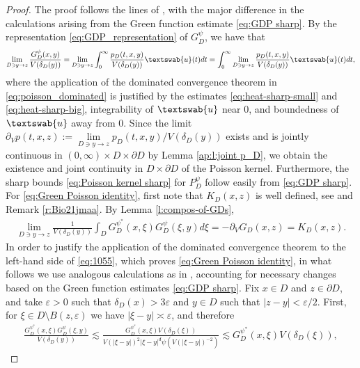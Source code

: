 \documentclass[12pt,a4paper,onecolumn]{article}
\theoremstyle{definition}
\newcommand{\1}{\mathbf 1}
\newcommand{\de}{\delta_D}
\newcommand{\GDP}{G_D^\psi}
\newcommand{\GDPs}{G_D^{\psi^*}}
\newcommand{\PDS}{P^{\psi}_{ D}}
\newcommand{\uu}{\textswab{u}}
\numberwithin{equation}{section}
\begin{document}
\begin{proof}
		The proof follows the lines of \cite[Proposition 2.19]{Bio23cpaa}, with the major difference in the calculations arising from the Green function estimate \eqref{eq:GDP sharp}. By the representation \eqref{eq:GDP_representation} of $\GDP$, we have that
		\begin{align}\label{eq:poisson_dominated}
			 \lim\limits_{D\ni y\to z} \frac{\GDP(x,y)}{V(\de(y))}= \lim\limits_{D\ni y\to z}\int_0^\infty
			\frac{p_D(t,x,y)}{V(\de(y))}\uu(t)dt =\int_0^\infty
			\lim\limits_{D\ni y\to z}\frac{p_D(t,x,y)}{V(\de(y))}\uu(t)dt,
		\end{align}
        where the application of the dominated convergence theorem in \eqref{eq:poisson_dominated} is justified by the estimates \eqref{eq:heat-sharp-small} and \eqref{eq:heat-sharp-big}, integrability of  $\uu$ near 0, and boundedness of $\uu$ away from 0.
        Since the limit $\partial_V p(t,x,z):=\lim\limits_{D\ni y\to z}{p_D(t,x,y)}/{V(\de(y))}$ exists and is jointly continuous in $(0,\infty)\times D\times\partial D $ by Lemma \ref{ap:l:joint p_D}, we obtain the existence and joint continuity in $D\times\partial D$  of the Poisson kernel.  Furthermore, the sharp bounds \eqref{eq:Poisson kernel sharp} for $\PDS$ follow  easily from \eqref{eq:GDP sharp}.  For \eqref{eq:Green Poisson identity}, first note that $K_D(x,z)$ is well defined, see \cite[Subsection 4.6]{BVW-na21} and Remark \ref{r:Bio21jmaa}. By Lemma \ref{l:compos-of-GDs},
		\begin{align}\label{eq:1055}
			 \lim\limits_{D\ni y\to z}\frac{1}{V(\delta_D(y))}\int_D \GDPs(x,\xi)\GDP(\xi,y)d\xi=- \partial_V G_D(x,z)=K_D(x,z).
		\end{align}
		 In order to justify the application of the dominated convergence theorem to the left-hand side of \eqref{eq:1055}, which proves \eqref{eq:Green Poisson identity},  in what follows we use analogous calculations as in \cite[Proposition 2.19]{Bio23cpaa}, accounting for necessary changes based on the Green function estimates \eqref{eq:GDP sharp}.  Fix $x\in D$ and $z\in \partial D$, and take $\varepsilon>0$ such that $\de(x)>3\varepsilon$ and $y\in D$ such that $|z-y|<\varepsilon/2$.  First, for $\xi \in D\setminus B(z,\varepsilon)$ we have $|\xi-y|\asymp \varepsilon$, and therefore
		\begin{align}\label{eq:upper1}
			\frac{\GDPs(x,\xi)\GDP(\xi,y)}{V(\de(y))}\lesssim \frac{\GDPs(x,\xi)V(\de(\xi))}{V(|\xi-y|)^2|\xi -y|^d\psi(V(|\xi-y|)^{-2})}\lesssim \GDPs(x,\xi)V(\de(\xi)),
		\end{align}

\end{proof}
\end{document}
